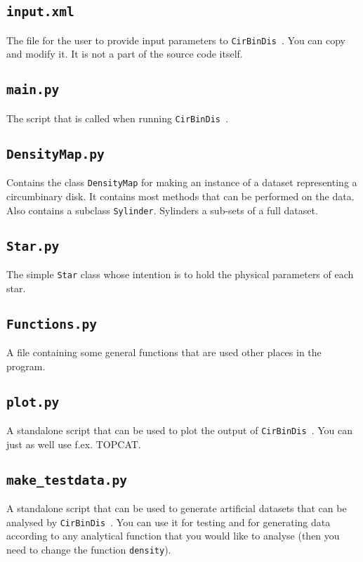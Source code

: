 \documentclass[a4paper, 12pt, english, titlepage]{article}
\newcommand{\sname}{\texttt{CirBinDis }}
\begin{document}
\subsection{\texttt{input.xml}}
    The file for the user to provide input parameters to \sname. You can copy and modify it. It is not a part of the source code itself.
    

\subsection{\texttt{main.py}}
    The script that is called when running \sname.
    

\subsection{\texttt{DensityMap.py}}
    Contains the class \texttt{DensityMap} for making an instance of a dataset representing a circumbinary disk. It contains most methods that can be performed on the data. Also contains a subclass \texttt{Sylinder}. Sylinders a sub-sets of a full dataset.
    

\subsection{\texttt{Star.py}}
    The simple \texttt{Star} class whose intention is to hold the physical parameters of each star.
    

\subsection{\texttt{Functions.py}}
    A file containing some general functions that are used other places in the program.
    

\subsection{\texttt{plot.py}}
    A standalone script that can be used to plot the output of \sname. You can just as well use f.ex. TOPCAT.
    

\subsection{\texttt{make\_testdata.py}}
    A standalone script that can be used to generate artificial datasets that can be analysed by \sname. You can use it for testing and for generating data according to any analytical function that you would like to analyse (then you need to change the function \texttt{density}).
    
\end{document}
